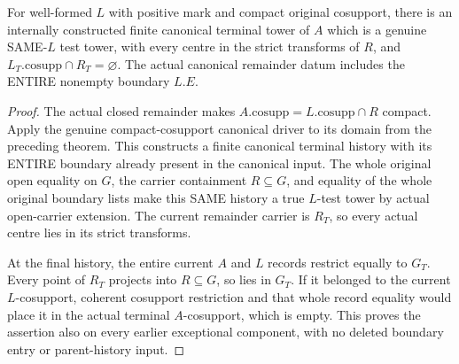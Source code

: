 \begin{theorem}
\label{hir:boundary-coefficient-remainder-finite-parent-phase}
\leanok
For well-formed $L$ with positive mark and compact original cosupport, there
is an internally constructed finite canonical terminal tower of $A$ which
is a genuine SAME-$L$ test tower, with every centre in the strict transforms
of $R$, and $L_T.\mathrm{cosupp}\cap R_T=\varnothing$. The actual canonical
remainder datum includes the ENTIRE nonempty boundary $L.E$.
\end{theorem}
\begin{proof}
The actual closed remainder makes $A.\mathrm{cosupp}=L.\mathrm{cosupp}\cap R$
compact. Apply the genuine compact-cosupport canonical driver to its domain
from the preceding theorem. This constructs a finite canonical terminal
history with its ENTIRE boundary already present in the canonical input.
The whole original open equality on $G$, the carrier containment $R\subseteq G$,
and equality of the whole original boundary lists make this SAME history
a true $L$-test tower by actual open-carrier extension. The current remainder
carrier is $R_T$, so every actual centre lies in its strict transforms.

At the final history, the entire current $A$ and $L$ records restrict equally
to $G_T$. Every point of $R_T$ projects into $R\subseteq G$, so lies in $G_T$.
If it belonged to the current $L$-cosupport, coherent cosupport restriction
and that whole record equality would place it in the actual terminal
$A$-cosupport, which is empty. This proves the assertion also on every earlier
exceptional component, with no deleted boundary entry or parent-history input.
\end{proof}

